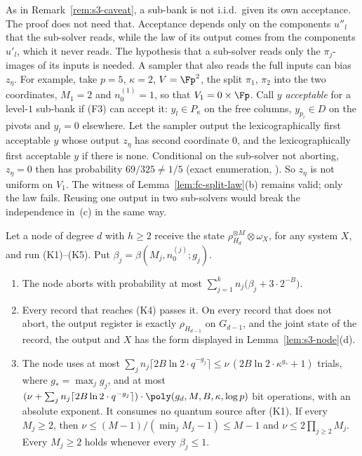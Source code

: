 As in Remark~\ref{rem:s3-caveat}, a sub-bank is not i.i.d.\ given its own acceptance. The proof does not need that. Acceptance depends only on the components $u''_l$ that the sub-solver reads, while the law of its output comes from the components $u'_l$, which it never reads. The hypothesis that a sub-solver reads only the $\pi_j$-images of its inputs is needed. A sampler that also reads the full inputs can bias $z_\eta$. For example, take $p = 5$, $\kappa = 2$, $V = \Fp^2$, the split $\pi_1$, $\pi_2$ into the two coordinates, $M_1 = 2$ and $n_0^{(1)} = 1$, so that $V_1 = 0\times\Fp$. Call $y$ \emph{acceptable} for a level-$1$ sub-bank if (F3) can accept it: $y_l \in P_\kappa$ on the free columns, $y_{p_i} \in D$ on the pivots and $y_l = 0$ elsewhere. Let the sampler output the lexicographically first acceptable $y$ whose output $z_\eta$ has second coordinate $0$, and the lexicographically first acceptable $y$ if there is none. Conditional on the sub-solver not aborting, $z_\eta = 0$ then has probability $69/325 \ne 1/5$ (exact enumeration, ). So $z_\eta$ is not uniform on $V_1$. The witness of Lemma~\ref{lem:fc-split-law}(b) remains valid; only the law fails. Reusing one output in two sub-solvers would break the independence in~(c) in the same way.

\begin{proposition}
\label{prop:fc-split-node}
Let a node of degree $d$ with $h \ge 2$ receive the state $\rho_{H_d}^{\otimes M}\otimes\omega_X$, for any system $X$, and run (K1)--(K5). Put $\beta_j = \beta(M_j, n_0^{(j)}; g_j)$.
\begin{enumerate}[label=(\alph*),leftmargin=2em]
  \item The node aborts with probability at most $\sum_{j=1}^k n_j\bigl(\beta_j + 3\cdot 2^{-B}\bigr)$.
  \item Every record that reaches (K4) passes it. On every record that does not abort, the output register is exactly $\rho_{H_{d-1}}$ on $G_{d-1}$, and the joint state of the record, the output and $X$ has the form displayed in Lemma~\ref{lem:s3-node}(d).
  \item The node uses at most $\sum_j n_j\lceil 2B\ln 2\cdot q^{-g_j}\rceil \le \nu\,(2B\ln 2\cdot\kappa^{g_*} + 1)$ trials, where $g_* = \max_jg_j$, and at most $(\nu + \sum_jn_j\lceil 2B\ln2\cdot q^{-g_j}\rceil)\cdot\poly(g_d, M, B, \kappa, \log p)$ bit operations, with an absolute exponent. It consumes no quantum source after (K1). If every $M_j \ge 2$, then $\nu \le (M-1)/(\min_jM_j - 1) \le M-1$ and $\nu \le 2\prod_{j\ge2}M_j$. Every $M_j \ge 2$ holds whenever every $\beta_j \le 1$.
\end{enumerate}
\end{proposition}

